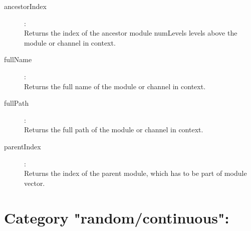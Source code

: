 \begin{description}
\item[ancestorIndex]:  \\
    Returns the index of the ancestor module numLevels levels above the module or channel in context.
\item[fullName]:  \\
    Returns the full name of the module or channel in context.
\item[fullPath]:  \\
    Returns the full path of the module or channel in context.
\item[parentIndex]:  \\
    Returns the index of the parent module, which has to be part of module vector.

\end{description}

\section{Category "random/continuous":}
\label{sec:ned-functions:category-random-continuous}

